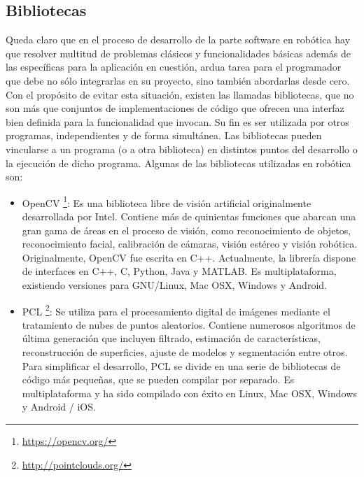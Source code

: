 \subsection{Bibliotecas}
Queda claro que en el proceso de desarrollo de la parte software en robótica hay que resolver multitud de problemas clásicos y funcionalidades básicas además de las específicas para la aplicación en cuestión, ardua tarea para el programador que debe no sólo integrarlas en su proyecto, sino también abordarlas desde cero. Con el propósito de evitar esta situación, existen las llamadas bibliotecas, que no son más que conjuntos de implementaciones de código que ofrecen una interfaz bien definida para la funcionalidad que invocan. Su fin es ser utilizada por otros programas, independientes y de forma simultánea. Las bibliotecas pueden vincularse a un programa (o a otra biblioteca) en distintos puntos del desarrollo o la ejecución de dicho programa. Algunas de las bibliotecas utilizadas en robótica son: 
\begin{itemize}
	\item OpenCV \footnote{\url{https://opencv.org/}}: Es una biblioteca libre de visión artificial originalmente desarrollada por Intel. Contiene más de quinientas funciones que abarcan una gran gama de áreas en el proceso de visión, como reconocimiento de objetos, reconocimiento facial, calibración de cámaras, visión estéreo y visión robótica. Originalmente, OpenCV fue escrita en C++. Actualmente, la librería dispone de interfaces en C++, C, Python, Java y MATLAB. Es multiplataforma, existiendo versiones para GNU/Linux, Mac OSX, Windows y Android. 
 \item PCL \footnote{\url{http://pointclouds.org/}}: Se utiliza para el procesamiento digital de imágenes mediante el tratamiento de nubes de puntos aleatorios. Contiene numerosos algoritmos de última generación que incluyen filtrado, estimación de características, reconstrucción de superficies, ajuste de modelos y segmentación entre otros. Para simplificar el desarrollo, PCL se divide en una serie de bibliotecas de código más pequeñas, que se pueden compilar por separado. Es multiplataforma y ha sido compilado con éxito en Linux, Mac OSX, Windows y Android / iOS.
\end{itemize}

